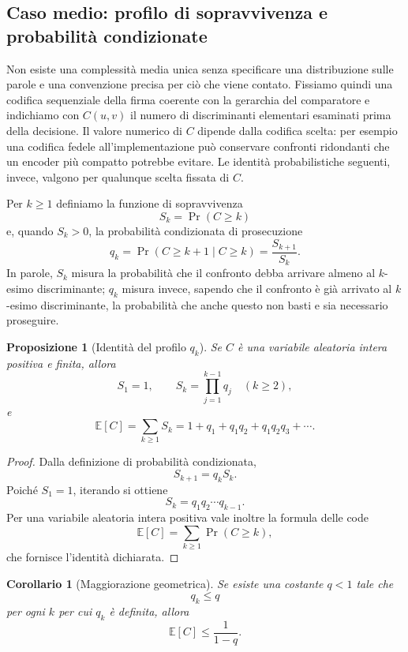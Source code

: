 \documentclass[11pt,a4paper]{article}
\newtheorem{proposizione}[teorema]{Proposizione}
\newtheorem{corollario}[teorema]{Corollario}
\theoremstyle{definition}
\theoremstyle{remark}
\begin{document}
\subsection{Caso medio: profilo di sopravvivenza e probabilità condizionate}

Non esiste una complessità media unica senza specificare una distribuzione sulle parole e una convenzione precisa per ciò che viene contato. Fissiamo quindi una codifica sequenziale della firma coerente con la gerarchia del comparatore e indichiamo con $C(u,v)$ il numero di discriminanti elementari esaminati prima della decisione. Il valore numerico di $C$ dipende dalla codifica scelta: per esempio una codifica fedele all'implementazione può conservare confronti ridondanti che un encoder più compatto potrebbe evitare. Le identità probabilistiche seguenti, invece, valgono per qualunque scelta fissata di $C$.

Per $k\geq1$ definiamo la funzione di sopravvivenza
\[
  S_k=\Pr(C\geq k)
\]
e, quando $S_k>0$, la probabilità condizionata di prosecuzione
\[
  q_k=\Pr(C\geq k+1\mid C\geq k)
      =\frac{S_{k+1}}{S_k}.
\]
In parole, $S_k$ misura la probabilità che il confronto debba arrivare almeno al $k$-esimo discriminante; $q_k$ misura invece, sapendo che il confronto è già arrivato al $k$-esimo discriminante, la probabilità che anche questo non basti e sia necessario proseguire.

\begin{proposizione}[Identità del profilo $q_k$]
Se $C$ è una variabile aleatoria intera positiva e finita, allora
\[
  S_1=1,
  \qquad
  S_k=\prod_{j=1}^{k-1}q_j\quad(k\geq2),
\]
e
\[
  \mathbb{E}[C]
  =\sum_{k\geq1}S_k
  =1+q_1+q_1q_2+q_1q_2q_3+\cdots.
\]
\end{proposizione}

\begin{proof}
Dalla definizione di probabilità condizionata,
\[
  S_{k+1}=q_kS_k.
\]
Poiché $S_1=1$, iterando si ottiene
\[
  S_k=q_1q_2\cdots q_{k-1}.
\]
Per una variabile aleatoria intera positiva vale inoltre la formula delle code
\[
  \mathbb{E}[C]=\sum_{k\geq1}\Pr(C\geq k),
\]
che fornisce l'identità dichiarata.
\end{proof}

\begin{corollario}[Maggiorazione geometrica]
Se esiste una costante $q<1$ tale che
\[
  q_k\leq q
\]
per ogni $k$ per cui $q_k$ è definita, allora
\[
  \mathbb{E}[C]\leq\frac{1}{1-q}.
\]
\end{corollario}
\end{document}
